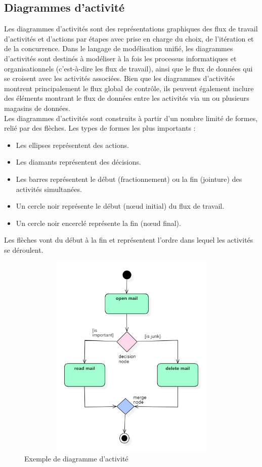\documentclass[12pt]{report}
\begin{document}
\newpage

\subsection{Diagrammes d'activité}

Les diagrammes d'activités sont des représentations graphiques des flux de travail d'activités et d'actions
par étapes avec prise en charge du choix, de l'itération et de la concurrence.
Dans le langage de modélisation unifié, les diagrammes d'activités sont destinés à modéliser
à la fois les processus informatiques et organisationnels (c'est-à-dire les flux de travail),
ainsi que le flux de données qui se croisent avec les activités associées. Bien que les
diagrammes d'activités montrent principalement le flux global de contrôle, ils peuvent
également inclure des éléments montrant le flux de données entre les activités via un ou
plusieurs magasins de données.
\\
Les diagrammes d'activités sont construits à partir d'un nombre limité de formes, relié par des flèches. Les types de formes les plus importants :
\begin{itemize}
    \item Les ellipses représentent des actions.
    \item Les diamants représentent des décisions.
    \item Les barres représentent le début (fractionnement) ou la fin (jointure) des activités simultanées.
    \item Un cercle noir représente le début (nœud initial) du flux de travail.
    \item Un cercle noir encerclé représente la fin (nœud final).
\end{itemize}
Les flèches vont du début à la fin et représentent l'ordre dans lequel les activités se déroulent.

\begin{figure}[h]
\centering
    \centerline{\includegraphics[width = 4.5in, height = 3.9in]{../Images/DiagActEX.png}}
    \caption{Exemple de diagramme d'activité}
\end{figure}
\end{document}
